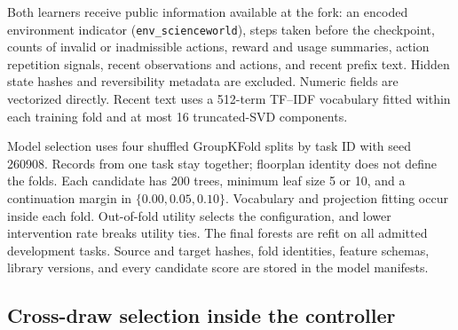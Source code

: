 Both learners receive public information available at the fork: an encoded environment indicator (\texttt{env\_scienceworld}), steps taken before the checkpoint, counts of invalid or inadmissible actions, reward and usage summaries, action repetition signals, recent observations and actions, and recent prefix text. Hidden state hashes and reversibility metadata are excluded. Numeric fields are vectorized directly. Recent text uses a 512-term TF--IDF vocabulary fitted within each training fold and at most 16 truncated-SVD components.

Model selection uses four shuffled GroupKFold splits by task ID with seed 260908. Records from one task stay together; floorplan identity does not define the folds. Each candidate has 200 trees, minimum leaf size 5 or 10, and a continuation margin in $\{0.00,0.05,0.10\}$. Vocabulary and projection fitting occur inside each fold. Out-of-fold utility selects the configuration, and lower intervention rate breaks utility ties. The final forests are refit on all admitted development tasks. Source and target hashes, fold identities, feature schemas, library versions, and every candidate score are stored in the model manifests.

\subsection{Cross-draw selection inside the controller}
\label{sec:crossdraw}

